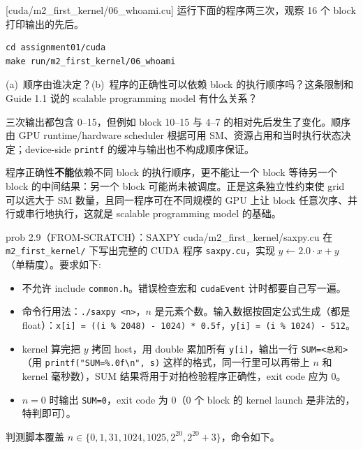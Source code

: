 \documentclass[11pt,a4paper,fontset=none]{ctexart}
\begin{document}
[cuda/m2\_first\_kernel/06\_whoami.cu]
运行下面的程序两三次，观察 16 个 block 打印输出的先后。

\begin{lstlisting}
cd assignment01/cuda
make run/m2_first_kernel/06_whoami
\end{lstlisting}

(a)~顺序由谁决定？(b)~程序的正确性可以依赖 block 的执行顺序吗？这条限制和 Guide 1.1 说的 scalable programming model 有什么关系？

\begin{answer}
三次输出都包含 0--15，但例如 block 10--15 与 4--7 的相对先后发生了变化。顺序由 GPU runtime/hardware scheduler 根据可用 SM、资源占用和当时执行状态决定；device-side \texttt{printf} 的缓冲与输出也不构成顺序保证。

程序正确性\textbf{不能}依赖不同 block 的执行顺序，更不能让一个 block 等待另一个 block 的中间结果：另一个 block 可能尚未被调度。正是这条独立性约束使 grid 可以远大于 SM 数量，且同一程序可在不同规模的 GPU 上让 block 任意次序、并行或串行地执行，这就是 scalable programming model 的基础。
\end{answer}

\begin{capstone}{prob 2.9（FROM-SCRATCH）：SAXPY \hfill {\footnotesize\ttfamily cuda/m2\_first\_kernel/saxpy.cu}}
在 \texttt{m2\_first\_kernel/} 下写出完整的 CUDA 程序 \texttt{saxpy.cu}，实现 $y \leftarrow 2.0 \cdot x + y$（单精度）。要求如下:
\begin{itemize}
  \item 不允许 include \texttt{common.h}。错误检查宏和 \texttt{cudaEvent} 计时都要自己写一遍。
  \item 命令行用法：\texttt{./saxpy <n>}，$n$ 是元素个数。输入数据按固定公式生成（都是 float）：\texttt{x[i] = ((i \% 2048) - 1024) * 0.5f}，\texttt{y[i] = (i \% 1024) - 512}。
  \item kernel 算完把 $y$ 拷回 host，用 double 累加所有 \texttt{y[i]}，输出一行 \texttt{SUM=<总和>}（用 \texttt{printf("SUM=\%.0f\textbackslash n", s)} 这样的格式，同一行里可以再带上 $n$ 和 kernel 毫秒数），SUM 结果将用于对拍检验程序正确性，exit code 应为 0。
  \item $n = 0$ 时输出 \texttt{SUM=0}，exit code 为 0（0 个 block 的 kernel launch 是非法的，特判即可）。
\end{itemize}
\end{capstone}

判测脚本覆盖 $n \in \{0, 1, 31, 1024, 1025, 2^{20}, 2^{20}{+}3\}$，命令如下。
\end{document}
